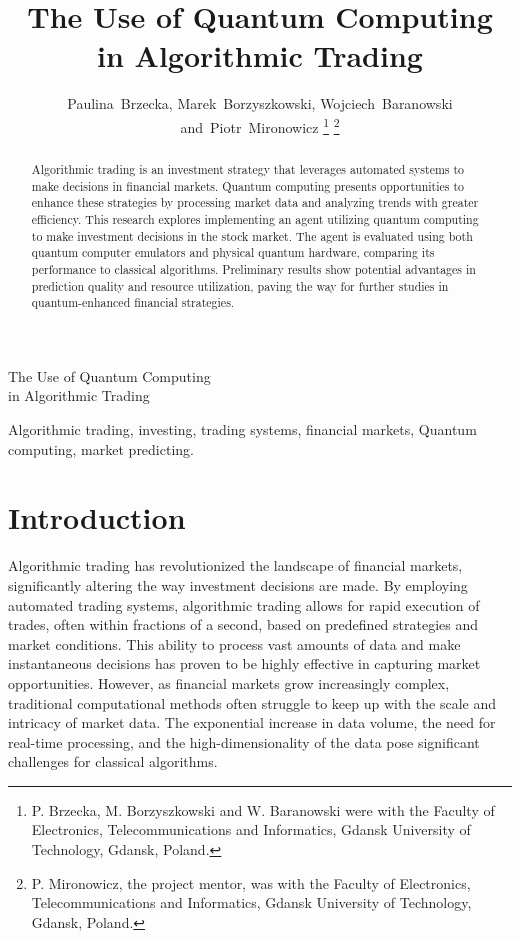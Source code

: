 \documentclass[journal]{IEEEtran}
\begin{document}
\title{The Use of Quantum Computing\\ in Algorithmic Trading}

\author{Paulina~Brzecka,
        Marek~Borzyszkowski,
        Wojciech~Baranowski
        and~Piotr~Mironowicz%
\thanks{P. Brzecka, M. Borzyszkowski and W. Baranowski were with the Faculty 
of Electronics, Telecommunications and Informatics, Gdansk University of Technology, Gdansk,
Poland.}%
\thanks{P. Mironowicz, the project mentor, was with the Faculty 
of Electronics, Telecommunications and Informatics, Gdansk University of Technology, Gdansk,
Poland.}
}

%
{The Use of Quantum Computing\\ in Algorithmic Trading}

\maketitle

\begin{abstract}
Algorithmic trading is an investment strategy that leverages automated systems to make decisions in financial markets. Quantum computing presents opportunities to enhance these strategies by processing market data and analyzing trends with greater efficiency. This research explores implementing an agent utilizing quantum computing to make investment decisions in the stock market. The agent is evaluated using both quantum computer emulators and physical quantum hardware, comparing its performance to classical algorithms. Preliminary results show potential advantages in prediction quality and resource utilization, paving the way for further studies in quantum-enhanced financial strategies.
\end{abstract}

\begin{IEEEkeywords}
Algorithmic trading, investing, trading systems, financial markets, Quantum computing, market predicting.
\end{IEEEkeywords}

\section{Introduction}
Algorithmic trading has revolutionized the landscape of financial markets, significantly altering the way investment decisions are made. By employing automated trading systems, algorithmic trading allows for rapid execution of trades, often within fractions of a second, based on predefined strategies and market conditions. This ability to process vast amounts of data and make instantaneous decisions has proven to be highly effective in capturing market opportunities. However, as financial markets grow increasingly complex, traditional computational methods often struggle to keep up with the scale and intricacy of market data. The exponential increase in data volume, the need for real-time processing, and the high-dimensionality of the data pose significant challenges for classical algorithms.
\end{document}
